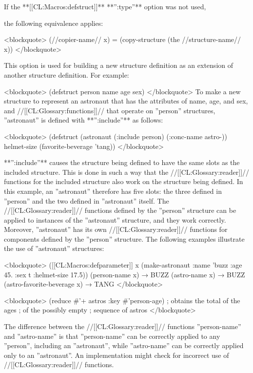 If the **[[CL:Macros:defstruct]]** **'':type''** option was not used,

the following equivalence applies:

<blockquote> (//copier-name// x) = (copy-structure (the //structure-name// x)) </blockquote>


This option is used for building a new structure definition as an extension of another structure definition. For example:

<blockquote> (defstruct person name age sex) </blockquote> To make a new structure to represent an astronaut that has the attributes of name, age, and sex, and //[[CL:Glossary:functions]]// that operate on ''person'' structures, ''astronaut'' is defined with **'':include''** as follows:

<blockquote> (defstruct (astronaut (:include person) (:conc-name astro-)) helmet-size (favorite-beverage 'tang)) </blockquote>

**'':include''** causes the structure being defined to have the same slots as the included structure. This is done in such a way that the //[[CL:Glossary:reader]]// functions for the included structure also work on the structure being defined. In this example, an ''astronaut'' therefore has five slots: the three defined in ''person'' and the two defined in ''astronaut'' itself. The //[[CL:Glossary:reader]]// functions defined by the ''person'' structure can be applied to instances of the ''astronaut'' structure, and they work correctly. Moreover, ''astronaut'' has its own //[[CL:Glossary:reader]]// functions for components defined by the ''person'' structure. The following examples illustrate the use of ''astronaut'' structures:

<blockquote> ([[CL:Macros:defparameter]] x (make-astronaut :name 'buzz :age 45. :sex t :helmet-size 17.5)) (person-name x) → BUZZ (astro-name x) → BUZZ (astro-favorite-beverage x) → TANG </blockquote>

<blockquote> (reduce #'+ astros :key #'person-age) ; obtains the total of the ages ; of the possibly empty ; sequence of astros </blockquote>

The difference between the //[[CL:Glossary:reader]]// functions ''person-name'' and ''astro-name'' is that ''person-name'' can be correctly applied to any ''person'', including an ''astronaut'', while ''astro-name'' can be correctly applied only to an ''astronaut''. An implementation might check for incorrect use of //[[CL:Glossary:reader]]// functions.

